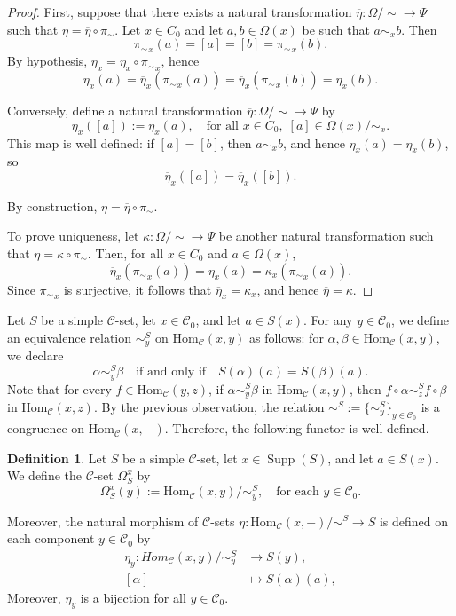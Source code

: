 \documentclass[a4paper]{article}
\theoremstyle{definition}
\newtheorem{defi}[thm]{Definition}
\theoremstyle{remark}
\newcommand*{\cat}[1]{\mathcal{#1}}
\newcommand*{\obj}[1]{#1_0}
\begin{document}
\begin{proof}
First, suppose that there exists a natural transformation $ \overline{\eta} \colon \Omega/\sim \longrightarrow \Psi$ such that $\eta = \overline{\eta} \circ \pi_{\sim}$. Let $x \in \obj{C}$ and let $a,b \in \Omega(x)$ be such that $a \sim_x b$. Then
\[
    {\pi_{\sim}}_x(a) = [a] = [b] = {\pi_{\sim}}_x(b).
\]
By hypothesis, $\eta_x = \overline{\eta}_x \circ {\pi_{\sim}}_x$, hence
\[
    \eta_x(a) = \overline{\eta}_x({\pi_{\sim}}_x(a)) = \overline{\eta}_x({\pi_{\sim}}_x(b)) = \eta_x(b).
\]

Conversely, define a natural transformation $\overline{\eta} \colon \Omega/\sim \to \Psi$ by
\[
    \overline{\eta}_x([a]) := \eta_x(a), \quad \text{for all } x \in \obj{C},\; [a] \in \Omega(x)/\sim_x.
\]
This map is well defined: if $[a] = [b]$, then $a \sim_x b$, and hence $\eta_x(a) = \eta_x(b)$, so
\[
    \overline{\eta}_x([a]) = \overline{\eta}_x([b]).
\]

By construction, $\eta = \overline{\eta} \circ \pi_{\sim}$. 

To prove uniqueness, let $\kappa \colon \Omega/\sim \to \Psi$ be another natural transformation such that $\eta = \kappa \circ \pi_{\sim}$. Then, for all $x \in \obj{C}$ and $a \in \Omega(x)$,
\[
    \overline{\eta}_x({\pi_{\sim}}_x(a)) = \eta_x(a) = \kappa_x({\pi_{\sim}}_x(a)).
\]
Since ${\pi_{\sim}}_x$ is surjective, it follows that $\overline{\eta}_x = \kappa_x$, and hence $\overline{\eta} = \kappa$.
\end{proof}

Let $S$ be a simple $\cat{C}$-set, let $x \in \cat{C}_0$, and let $a \in S(x)$. For any $y \in \cat{C}_0$, we define an equivalence relation $\sim_y^S$ on $\mathrm{Hom}_{\cat{C}}(x,y)$ as follows: for $\alpha, \beta \in \mathrm{Hom}_{\cat{C}}(x,y)$, we declare
\[
\alpha \sim_y^S \beta \quad \text{if and only if} \quad S(\alpha)(a) = S(\beta)(a).
\]
Note that for every $f \in \mathrm{Hom}_{\cat{C}}(y,z)$, if $\alpha \sim_y^S \beta$ in $\mathrm{Hom}_{\cat{C}}(x,y)$, then
$ f \circ \alpha \sim_z^S f \circ \beta$ 
in $\mathrm{Hom}_{\cat{C}}(x,z)$.
By the previous observation, the relation $\sim^S := \{\sim_y^S\}_{y \in \cat{C}_0}$ is a congruence on $\mathrm{Hom}_{\cat{C}}(x,-)$. Therefore, the following functor is well defined.

\begin{defi}
Let $S$ be a simple $\cat{C}$-set, let $x\in \operatorname{Supp}(S)$, and let $a\in S(x)$. We define the $\cat{C}$-set $\Omega_S^x$ by
\[
\Omega^x_S(y) := \mathrm{Hom}_{\cat{C}}(x,y)/\sim_y^S,
\quad \text{for each } y \in \cat{C}_0.
\]
\end{defi}
Moreover, the natural morphism of $\cat{C}$-sets
$ 
\eta \colon \mathrm{Hom}_{\cat{C}}(x,-)/\sim^S \longrightarrow S
$
is defined on each component $y \in \cat{C}_0$ by
\begin{align*}
    \eta_y \colon Hom_{\cat{C}}(x, y)/\sim^S_y &\longrightarrow S(y), \\
    [\alpha] &\longmapsto S(\alpha)(a),
\end{align*}
Moreover, $\eta_y$ is a bijection for all $y \in \cat{C}_0$.
\end{document}
